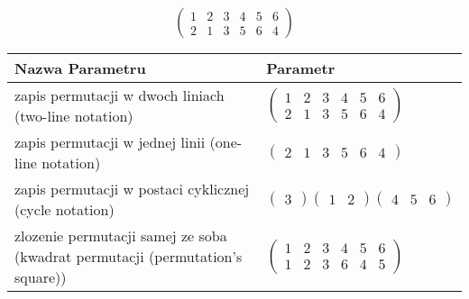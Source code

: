 \documentclass[12pt]{article}
\begin{document}
\subsection{}
\begin{center}
\[
\begin{pmatrix}
	1 & 2 & 3 & 4 & 5 & 6 \\ 
	2 & 1 & 3 & 5 & 6 & 4 
\end{pmatrix}
\]

\begin{tabular}{|m{0.6\linewidth}|m{0.4\linewidth}|}
	\hline
	Nazwa Parametru & Parametr \\
	\hline
	zapis permutacji w dwoch liniach (two-line notation) & $\begin{pmatrix} 1 & 2 & 3 & 4 & 5 & 6 \\ 
2 & 1 & 3 & 5 & 6 & 4 \end{pmatrix}$ \\ 
	\hline
	zapis permutacji w jednej linii (one-line notation) & $\begin{pmatrix} 2 & 1 & 3 & 5 & 6 & 4 \end{pmatrix}$ \\ 
	\hline
	zapis permutacji w postaci cyklicznej (cycle notation) & $\begin{pmatrix} 3 \end{pmatrix} \begin{pmatrix} 1 & 2 \end{pmatrix} \begin{pmatrix} 4 & 5 & 6 \end{pmatrix} $ \\ 
	\hline
	zlozenie permutacji samej ze soba (kwadrat permutacji (permutation's square)) & $\begin{pmatrix} 1 & 2 & 3 & 4 & 5 & 6 \\ 
1 & 2 & 3 & 6 & 4 & 5 \end{pmatrix}$ \\ 
	\hline
\end{tabular}
\end{center}
\end{document}
